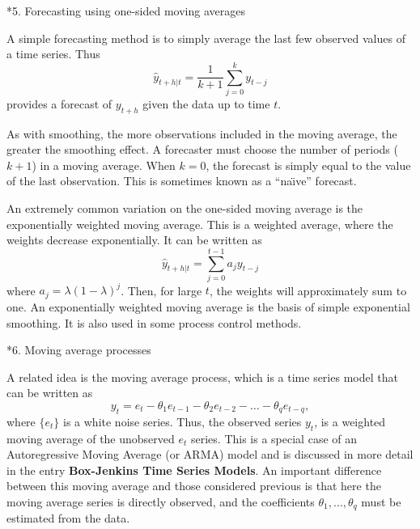 \documentclass[10pt]{article}
\makeatletter
\renewcommand{\section}%
{\@startsection{section}{1}{0mm}{\baselineskip}{0.5\baselineskip}{\normalfont\large\rmfamily\bfseries}}
\makeatother
\begin{document}
\section*{5. Forecasting using one-sided moving averages}
\label{sec:ma}

A simple forecasting method is to simply average the last few observed values of a time series. Thus
\[
\hat{y}_{t+h|t} =  \frac{1}{k+1}\sum_{j=0}^{k} y_{t-j}
\]
provides a forecast of $y_{t+h}$ given the data up to time $t$.

As with smoothing, the more observations included in  the moving  average,  the  greater  the  smoothing  effect.  A forecaster must choose the number of periods ($k+1$) in a moving average. When $k=0$, the forecast is simply equal to the value of the last observation. This is sometimes known as a ``na\"{\i}ve'' forecast.

An extremely common variation on the one-sided moving average is the exponentially weighted moving average. This is a weighted average, where the weights decrease exponentially. It can be written as
\[
\hat{y}_{t+h|t} =  \sum_{j=0}^{t-1} a_jy_{t-j}
\]
where $a_j = \lambda(1-\lambda)^j$. Then, for large $t$, the weights will approximately sum to one. An exponentially weighted moving average is the basis of simple exponential smoothing. It is also used in some process control methods.

\section*{6. Moving average processes}

A related idea is the moving average process, which is a time series model that can be written as
\[
y_t = e_t - \theta_1 e_{t-1} - \theta_2 e_{t-2} - \dots  - \theta_q e_{t-q},
\]
where $\{e_t\}$ is a white noise series. Thus, the observed series $y_t$, is a weighted moving average of the unobserved $e_t$ series. This is a special case of an Autoregressive Moving Average (or ARMA) model and is discussed in more detail in the entry \textbf{Box-Jenkins Time Series Models}. An important difference between this moving average and those considered previous is that here the moving average series is directly observed, and the coefficients $\theta_1,\dots,\theta_q$ must be estimated from the data.
\end{document}
